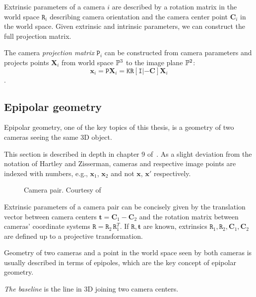 Extrinsic parameters of a camera $i$ are described by a rotation matrix in the world space $\mathtt{R}_i$ describing camera orientation and the camera center point  $\mathbf{C}_i$ in the world space.  
Given extrinsic and intrinsic parameters, we can construct the full projection matrix.

\begin{defn}
The camera \textit{projection matrix} $\mathtt{P}_i$ can be constructed from camera parameters and projects points $\mathbf{X}_i$ from world space $\mathbb{P}^3$ to the image plane $\mathbb{P}^2$: \[\mathbf{x}_i = \mathtt{P} \mathbf{X}_i =  \mathtt{K} \mathtt{R} [ \mathtt{I} | -\mathbf{C} ] \mathbf{X}_i \].

\end{defn}


\subsection{Epipolar geometry} 
Epipolar geometry, one of the key topics of this thesis, is a geometry of two cameras seeing the same 3D object. 

This section is described in depth in chapter 9 of~\cite{HartZiss}. As a slight deviation from the notation of Hartley and Zisserman, cameras and respective image points are indexed with numbers, e.g., $\mathbf{x}_1$, $\mathbf{x}_2$ and not $\mathbf{x}$, $\mathbf{x}'$ respectively.


\begin{figure}[t]%
    \centering
    \qquad
    \caption[Camera pair]{Camera pair. Courtesy of~\cite{HartZiss}}%
    \label{fig:campair}%
\end{figure}

Extrinsic parameters of a camera pair can be concisely given by the translation vector between camera centers $\mathbf{t}= \mathbf{C}_1-\mathbf{C}_2$ and the rotation matrix between cameras' coordinate systems $\mathtt{R}=\mathtt{R}_2\,\mathtt{R}_1^T$. If $\mathtt{R}, \mathbf{t}$ are known, extrinsics $\mathtt{R}_1, \mathtt{R}_2, \mathbf{C}_1, \mathbf{C}_2$ are defined up to a projective transformation.

Geometry of two cameras and a point in the world space seen by both cameras is usually described in terms of epipoles, which are the key concept of epipolar geometry. 


\begin{defn}
\textit{The baseline} is the line in 3D joining two camera centers.
\end{defn}

